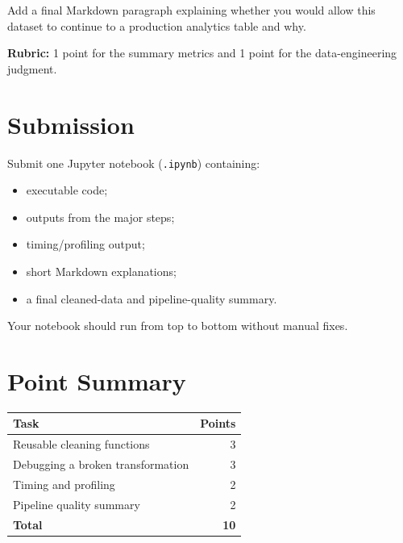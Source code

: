 \documentclass[10pt]{article}
\begin{document}
Add a final Markdown paragraph explaining whether you would allow this
dataset to continue to a production analytics table and why.

\textbf{Rubric:} 1 point for the summary metrics and 1 point for the
data-engineering judgment.

\section*{Submission}
Submit one Jupyter notebook (\texttt{.ipynb}) containing:
\begin{itemize}
    \item executable code;
    \item outputs from the major steps;
    \item timing/profiling output;
    \item short Markdown explanations;
    \item a final cleaned-data and pipeline-quality summary.
\end{itemize}

Your notebook should run from top to bottom without manual fixes.

%
%

\section*{Point Summary}
\begin{center}
\begin{tabular}{lr}
\toprule
Task & Points \\
\midrule
Reusable cleaning functions & 3 \\
Debugging a broken transformation & 3 \\
Timing and profiling & 2 \\
Pipeline quality summary & 2 \\
\midrule
\textbf{Total} & \textbf{10} \\
\bottomrule
\end{tabular}
\end{center}
\end{document}
